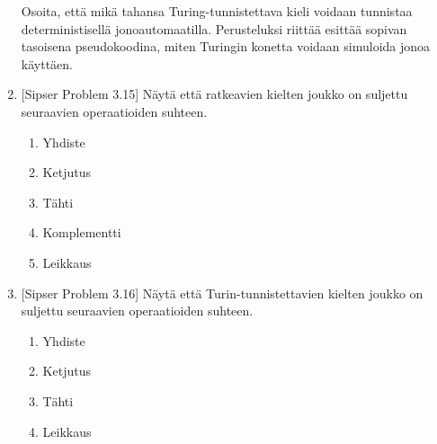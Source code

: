 \documentclass[finnish,11pt,draft]{article}
\begin{document}
\begin{enumerate}
  Osoita, että mikä tahansa Turing-tunnistettava kieli voidaan tunnistaa
  deterministisellä jonoautomaatilla. Perusteluksi riittää esittää sopivan
  tasoisena pseudokoodina, miten Turingin konetta voidaan simuloida jonoa
  käyttäen.

\item
  {[Sipser Problem 3.15]} Näytä että ratkeavien kielten joukko on suljettu
  seuraavien operaatioiden suhteen.
%
  \begin{enumerate}
  \item Yhdiste
  \item Ketjutus
  \item Tähti
  \item Komplementti
  \item Leikkaus
  \end{enumerate}

\item
  {[Sipser Problem 3.16]} Näytä että Turin-tunnistettavien kielten joukko on
  suljettu seuraavien operaatioiden suhteen.
%
  \begin{enumerate}
  \item Yhdiste
  \item Ketjutus
  \item Tähti
  \item Leikkaus
  \end{enumerate}
\end{enumerate}
\end{document}

